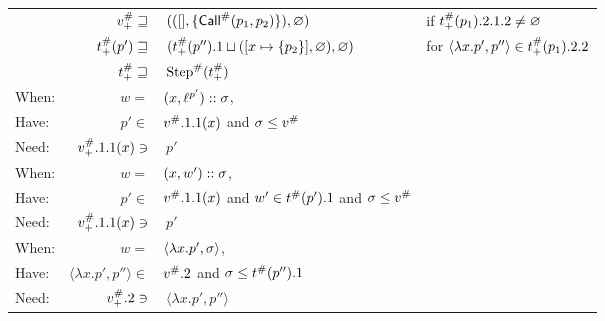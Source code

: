 \documentclass{article}
\begin{document}
\begin{center}
\begin{tabular}{|l@{\hskip2pt}r@{\hskip2pt}l@{\hskip2pt}l|}
		      & ${v}^{\#}_+\sqsupseteq$              & $\:(([],\{{\textsf{Call}}^{\#}(p_1,p_2)\}),\varnothing)$                             & if ${t}^{\#}_+(p_1).2.1.2\neq\varnothing$                  \\
		      & ${t}^{\#}_+(p')\sqsupseteq$       & $\:({t}^{\#}_+(p'').1\sqcup([x\mapsto\{p_2\}],\varnothing),\varnothing)$ & for $\langle\lambda x.p',p''\rangle\in{t}^{\#}_+(p_1).2.2$ \\
		      & ${t}^{\#}_+\sqsupseteq$           & $\:{\text{Step}}^{\#}({t}^{\#}_+)$                                                &                                                              \\
		\hline
		When: & $w=$                                & $(x,{\ell}^{p'})::\sigma$,                                          &                                                              \\
		Have: & $p'\in$                             & ${v}^{\#}.1.1(x)$ and $\sigma\le{v}^{\#}$                                      &                                                              \\
		Need: & ${v}^{\#}_+.1.1(x)\ni$               & $\:p'$                                                                     &                                                              \\
		\hline
		When: & $w=$                                & $(x,w')::\sigma$,                                                         &                                                              \\
		Have: & $p'\in$                             & ${v}^{\#}.1.1(x)$ and $w'\in{t}^{\#}(p').1$ and $\sigma\le{v}^{\#}$          &                                                              \\
		Need: & ${v}^{\#}_+.1.1(x)\ni$               & $\:p'$                                                                     &                                                              \\
		\hline
		When: & $w=$                                & $\langle\lambda x.p',\sigma\rangle$,                                         &                                                              \\
		Have: & $\langle\lambda x.p',p''\rangle\in$ & ${v}^{\#}.2$ and $\sigma\le{t}^{\#}(p'').1$                                 &                                                              \\
		Need: & ${v}^{\#}_+.2\ni$                    & $\:\langle\lambda x.p',p''\rangle$                                         &                                                              \\
		\hline
	\end{tabular}
\end{center}
\end{document}
